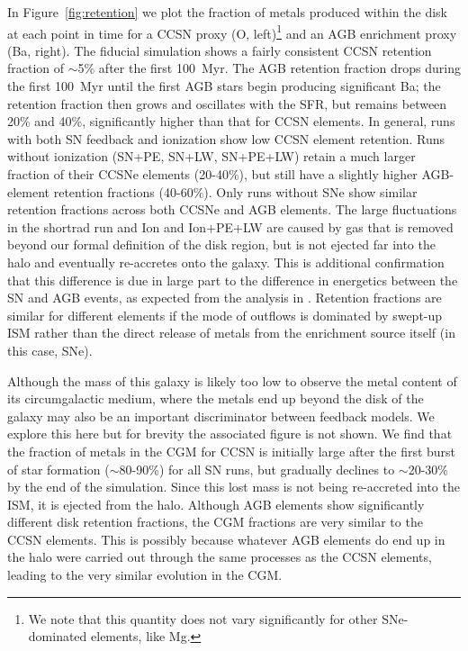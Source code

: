 \documentclass[twocolumn]{aastex62}
\begin{document}
In Figure~\ref{fig:retention} we plot the fraction of metals produced within the disk at each point in time for a CCSN proxy (O, left)\footnote{We note that this quantity does not vary significantly for other SNe-dominated elements, like Mg.} and an AGB enrichment proxy (Ba, right). The fiducial simulation shows a fairly consistent CCSN retention fraction of $\sim$5\% after the first 100~Myr. The AGB retention fraction drops during the first 100~Myr until the first AGB stars begin producing significant Ba; the retention fraction then grows and oscillates with the SFR, but remains between 20\% and 40\%, significantly higher than that for CCSN elements. In general, runs with both SN feedback and ionization show low CCSN element retention. Runs without ionization (SN+PE, SN+LW, SN+PE+LW) retain a much larger fraction of their CCSNe elements (20-40\%), but still have a slightly higher AGB-element retention fractions (40-60\%). Only runs without SNe show similar retention fractions across both CCSNe and AGB elements. The large fluctuations in the shortrad run and Ion and Ion+PE+LW are caused by gas that is removed beyond our formal definition of the disk region, but is not ejected far into the halo and eventually re-accretes onto the galaxy. This is additional confirmation that this difference is due in large part to the difference in energetics between the SN and AGB events, as expected from the analysis in \citet{Emerick2020a}. Retention fractions are similar for different elements if the mode of outflows is dominated by swept-up ISM rather than the direct release of metals from the enrichment source itself (in this case, SNe).  

Although the mass of this galaxy is likely too low to observe the metal content of its circumgalactic medium, where the metals end up beyond the disk of the galaxy may also be an important discriminator between feedback models. We explore this here but for brevity the associated figure is not shown. We find that the fraction of metals in the CGM for CCSN is initially large after the first burst of star formation ($\sim$80-90\%) for all SN runs, but gradually declines to $\sim$20-30\% by the end of the simulation. Since this lost mass is not being re-accreted into the ISM, it is ejected from the halo. Although AGB elements show significantly different disk retention fractions, the CGM fractions are very similar to the CCSN elements. This is possibly because whatever AGB elements do end up in the halo were carried out through the same processes as the CCSN elements, leading to the very similar evolution in the CGM.
\end{document}
